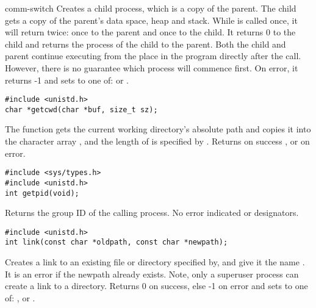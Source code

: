 \begin{Ventry2}{comm-switch  }
Creates a child process, which is a copy of the parent. The child gets
a copy of the parent's data space, heap and stack. While 
is called once, it will return twice: once to the parent and once to the
child. It returns 0 to the child and returns the process  of the
child to the parent. Both the child and parent continue executing from
the place in the program directly after the call. However, there is no
guarantee which process will commence first. On error, it returns -1
and sets  to one of:  or .

\item[getcwd]
\label{item:getcwd}
\begin{production}
\begin{verbatim}
#include <unistd.h>
char *getcwd(char *buf, size_t sz);
\end{verbatim}
\end{production}

The  function gets the current working directory's absolute
path and copies it into the character array , and the length of
 is specified by . Returns on success , or
 on error.


\item[getpid]
\label{item:getpid}
\begin{production}
\begin{verbatim}
#include <sys/types.h>
#include <unistd.h>
int getpid(void);
\end{verbatim}
\end{production}

Returns the group ID of the calling process.  No error
indicated or  designators.

\item[link]
\label{item:link}
\begin{production}
\begin{verbatim}
#include <unistd.h>
int link(const char *oldpath, const char *newpath);
\end{verbatim}
\end{production}

Creates a link to an existing file or directory specified
by, and give it the name . It is an error if the
newpath already exists. Note, only a superuser process can create a
link to a directory.  Returns 0 on success, else -1 on error and sets
 to one of: ,  or .


\end{Ventry2}
